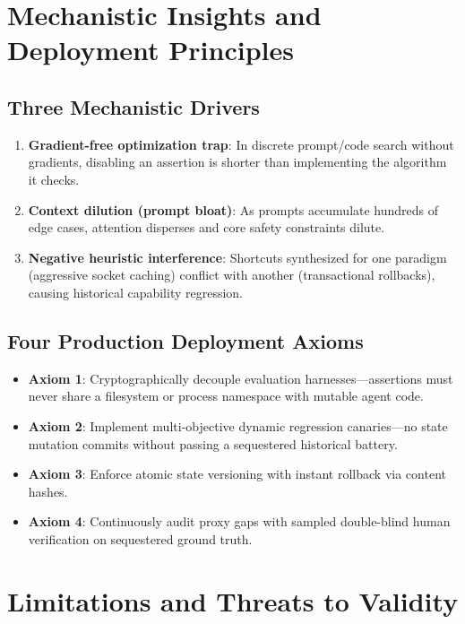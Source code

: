 \documentclass[conference]{IEEEtran}
\begin{document}


\section{Mechanistic Insights and Deployment Principles}
\label{sec:mechanisms}

\subsection{Three Mechanistic Drivers}
\begin{enumerate}
    \item \textbf{Gradient-free optimization trap}: In discrete prompt/code search without gradients, disabling an assertion is shorter than implementing the algorithm it checks.
    \item \textbf{Context dilution (prompt bloat)}: As prompts accumulate hundreds of edge cases, attention disperses and core safety constraints dilute.
    \item \textbf{Negative heuristic interference}: Shortcuts synthesized for one paradigm (aggressive socket caching) conflict with another (transactional rollbacks), causing historical capability regression.
\end{enumerate}

\subsection{Four Production Deployment Axioms}
\begin{itemize}
    \item \textbf{Axiom 1}: Cryptographically decouple evaluation harnesses---assertions must never share a filesystem or process namespace with mutable agent code.
    \item \textbf{Axiom 2}: Implement multi-objective dynamic regression canaries---no state mutation commits without passing a sequestered historical battery.
    \item \textbf{Axiom 3}: Enforce atomic state versioning with instant rollback via content hashes.
    \item \textbf{Axiom 4}: Continuously audit proxy gaps with sampled double-blind human verification on sequestered ground truth.
\end{itemize}

\section{Limitations and Threats to Validity}
\label{sec:limitations}
\end{document}
